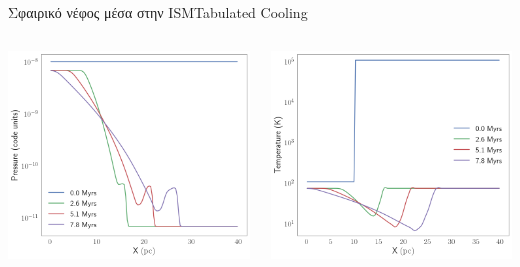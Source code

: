 \documentclass{beamer}
\begin{document}
\begin{frame}{Σφαιρικό νέφος μέσα στην ISM}{Tabulated Cooling}
	\begin{columns}
			\begin{center}
				\includegraphics[width=1\linewidth]{../Document/DataImages/TabCoolingPRSprofile}
			\end{center}
			\begin{center}
				\includegraphics[width=1\linewidth]{../Document/DataImages/TabCoolingTMPprofile}
			\end{center}
	\end{columns}
\end{frame}
\end{document}
